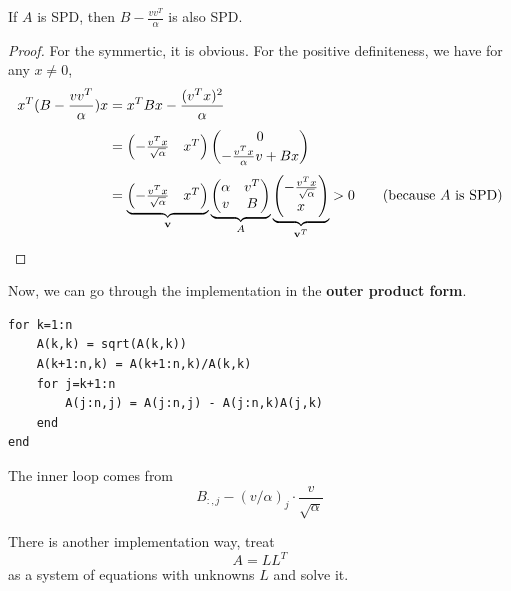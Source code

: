 \begin{lemma}
    If $A$ is SPD, then $B - \frac{vv^T}{\alpha}$ is also SPD.
\end{lemma}
\begin{proof}
    For the symmertic, it is obvious. For the positive definiteness, we have for any $x \neq 0$, 
    \begin{align*}
        x^T (B - \frac{vv^T}{\alpha}) x &= x^T B x - \frac{(v^T x)^2}{\alpha} \\[3pt]
        &= \begin{pmatrix}
            -\frac{v^T x}{\sqrt{\alpha}} & x^T
        \end{pmatrix} \begin{pmatrix}
            0 \\ -\frac{v^T x}{\alpha} v + Bx
        \end{pmatrix} \\[3pt]
        &= \underbrace{\begin{pmatrix}
            -\frac{v^T x}{\sqrt{\alpha}} & x^T
        \end{pmatrix}}_{\mathbf{v}} \underbrace{\begin{pmatrix}
            \alpha & v^T \\
            v & B
        \end{pmatrix}}_{A} \underbrace{\begin{pmatrix}
            -\frac{v^T x}{\sqrt{\alpha}} \\ x
        \end{pmatrix}}_{\mathbf{v}^T} > 0 \tag{\text{because $A$ is SPD}}
    \end{align*}
\end{proof}

\vspace{1em}

Now, we can go through the implementation in the \textbf{outer product form}.

\begin{verbatim}
for k=1:n
    A(k,k) = sqrt(A(k,k))
    A(k+1:n,k) = A(k+1:n,k)/A(k,k)
    for j=k+1:n
        A(j:n,j) = A(j:n,j) - A(j:n,k)A(j,k)
    end
end
\end{verbatim}

The inner loop comes from \[
    B_{:,j} - (v/\alpha)_j \cdot \frac{v}{\sqrt{\alpha}}
\]

\newpage

There is another implementation way, treat \[
    A = LL^T
\]
as a system of equations with unknowns $L$ and solve it.

